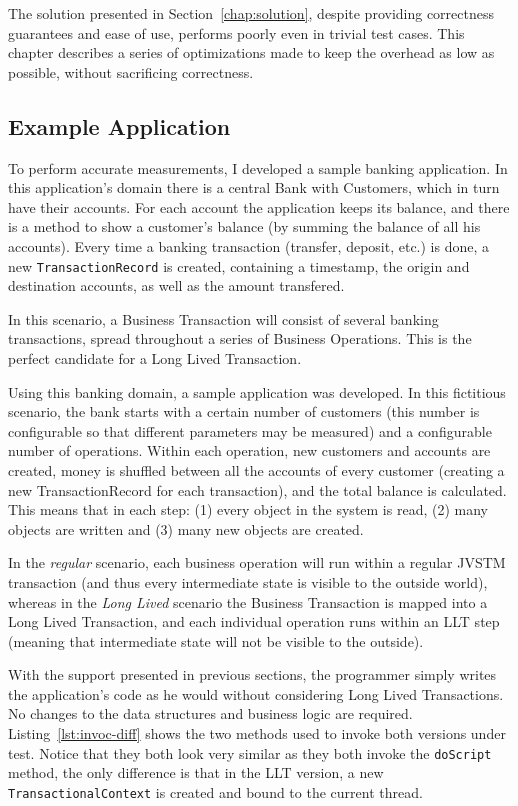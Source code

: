 \documentclass{llncs}
\begin{document}
The solution presented in Section~\ref{chap:solution}, despite
providing correctness guarantees and ease of use, performs poorly even
in trivial test cases. This chapter describes a series of
optimizations made to keep the overhead as low as possible, without
sacrificing correctness.

\subsection{Example Application}

To perform accurate measurements, I developed a sample banking
application. In this application's domain there is a central Bank with
Customers, which in turn have their accounts. For each account the
application keeps its balance, and there is a method to show a
customer's balance (by summing the balance of all his accounts). Every
time a banking transaction (transfer, deposit, etc.) is done, a new
\texttt{TransactionRecord} is created, containing a timestamp, the
origin and destination accounts, as well as the amount transfered.

In this scenario, a Business Transaction will consist of several
banking transactions, spread throughout a series of Business
Operations. This is the perfect candidate for a Long Lived
Transaction.

Using this banking domain, a sample application was developed. In this
fictitious scenario, the bank starts with a certain number of
customers (this number is configurable so that different parameters
may be measured) and a configurable number of operations. Within each
operation, new customers and accounts are created, money is shuffled
between all the accounts of every customer (creating a new
TransactionRecord for each transaction), and the total balance is
calculated. This means that in each step: (1) every object in the
system is read, (2) many objects are written and (3) many new objects
are created.

In the {\it regular} scenario, each business operation will run within
a regular JVSTM transaction (and thus every intermediate state is
visible to the outside world), whereas in the {\it Long Lived}
scenario the Business Transaction is mapped into a Long Lived
Transaction, and each individual operation runs within an LLT step
(meaning that intermediate state will not be visible to the outside).

With the support presented in previous sections, the programmer simply
writes the application's code as he would without considering Long
Lived Transactions. No changes to the data structures and business
logic are required. Listing~\ref{lst:invoc-diff} shows the two methods
used to invoke both versions under test. Notice that they both look
very similar as they both invoke the \texttt{doScript} method, the
only difference is that in the LLT version, a new
\texttt{TransactionalContext} is created and bound to the current
thread.
\end{document}

